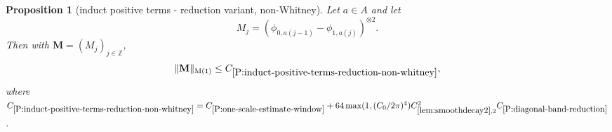 \documentclass[12pt,reqno]{amsart}
\theoremstyle{plain}
\newtheorem{proposition}[theorem]{Proposition}
\numberwithin{equation}{section}
\theoremstyle{remark}
\newcommand{\using}[1]{}
\newcommand{\Z}{{\mathbb Z}}
\newcommand{\M}{\mathbf{M}}
\begin{document}
\begin{proposition}[induct positive terms - reduction variant, non-Whitney]
\label{P:induct-positive-terms-reduction-non-whitney}\using{P:one-scale-estimate-window}\using{L:fourier-transform-window}\using{Operations on spaced sequences}\using{lem:smoothdecay2}\using{lem:scaleest}\using{P:vanishing-diagonal-reduction}\using{P:diagonal-band-reduction}
Let $a\in A$ and let
\begin{equation}\label{auto:non-Whitney-kernel}M_j=({\phi}_{0,a(j-1)}-{\phi}_{1,a(j)})^{\otimes 2}.\end{equation}
Then with $\M=(M_j)_{j\in \Z}$,  \begin{equation}\label{auto:non-Whitney-reduction-bound}\|\M\|_{\rm M(1)}\le C_{\ref{P:induct-positive-terms-reduction-non-whitney}},\end{equation}
where $C_{\ref{P:induct-positive-terms-reduction-non-whitney}}=C_{\ref{P:one-scale-estimate-window}}+ 64 \max(1,(C_0/2\pi)^4) C_{\ref{lem:smoothdecay2},2}^2C_{\ref{P:diagonal-band-reduction}}$.
\end{proposition}
\end{document}
